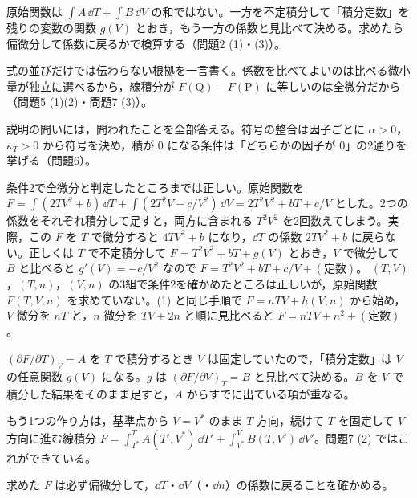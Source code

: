 \begin{daiji}
  \item 原始関数は $\int A\,\dd T + \int B\,\dd V$ の和ではない。一方を不定積分して「積分定数」を残りの変数の関数 $g(V)$ とおき，もう一方の係数と見比べて決める。求めたら偏微分して係数に戻るかで検算する（問題2 (1)・(3)）。
  \item 式の並びだけでは伝わらない根拠を一言書く。係数を比べてよいのは比べる微小量が独立に選べるから，線積分が $F(\mathrm{Q})-F(\mathrm{P})$ に等しいのは全微分だから（問題5 (1)(2)・問題7 (3)）。
  \item 説明の問いには，問われたことを全部答える。符号の整合は因子ごとに $\alpha>0$，$\kappa_{T}>0$ から符号を決め，積が 0 になる条件は「どちらかの因子が 0」の2通りを挙げる（問題6）。
\end{daiji}
\begin{kotaeran}
   条件2で全微分と判定したところまでは正しい。原始関数を $F=\int(2TV^{2}+b)\,\dd T+\int(2T^{2}V-c/V^{2})\,\dd V=2T^{2}V^{2}+bT+c/V$ とした。2つの係数をそれぞれ積分して足すと，両方に含まれる $T^{2}V^{2}$ を2回数えてしまう。実際，この $F$ を $T$ で微分すると $4TV^{2}+b$ になり，$\dd T$ の係数 $2TV^{2}+b$ に戻らない。正しくは $T$ で不定積分して $F=T^{2}V^{2}+bT+g(V)$ とおき，$V$ で微分して $B$ と比べると $g'(V)=-c/V^{2}$ なので $F=T^{2}V^{2}+bT+c/V+(\text{定数})$。
   $(T,V)$，$(T,n)$，$(V,n)$ の3組で条件2を確かめたところは正しいが，原始関数 $F(T,V,n)$ を求めていない。(1) と同じ手順で $F=nTV+h(V,n)$ から始め，$V$ 微分を $nT$ と，$n$ 微分を $TV+2n$ と順に見比べると $F=nTV+n^{2}+(\text{定数})$。
\end{kotaeran}
\begin{rikai}
  \item $(\partial F/\partial T)_{V}=A$ を $T$ で積分するとき $V$ は固定していたので，「積分定数」は $V$ の任意関数 $g(V)$ になる。$g$ は $(\partial F/\partial V)_{T}=B$ と見比べて決める。$B$ を $V$ で積分した結果をそのまま足すと，$A$ からすでに出ている項が重なる。
  \item もう1つの作り方は，基準点から $V=V^{*}$ のまま $T$ 方向，続けて $T$ を固定して $V$ 方向に進む線積分 $F=\int_{T^{*}}^{T}A(T',V^{*})\,\dd T'+\int_{V^{*}}^{V}B(T,V')\,\dd V'$。問題7 (2) ではこれができている。
  \item 求めた $F$ は必ず偏微分して，$\dd T$・$\dd V$（・$\dd n$）の係数に戻ることを確かめる。
\end{rikai}
